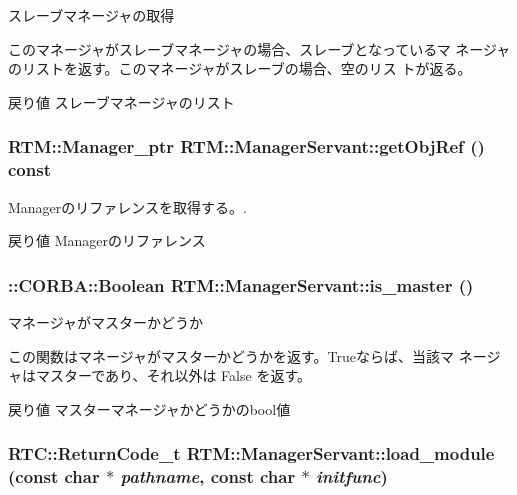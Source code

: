 スレーブマネージャの取得 

このマネージャがスレーブマネージャの場合、スレーブとなっているマ ネージャのリストを返す。このマネージャがスレーブの場合、空のリス トが返る。

\begin{DoxyReturn}{戻り値}
スレーブマネージャのリスト 
\end{DoxyReturn}
\subsubsection[{getObjRef}]{\setlength{\rightskip}{0pt plus 5cm}RTM::Manager\_\-ptr RTM::ManagerServant::getObjRef () const}\label{classRTM_1_1ManagerServant_a592b15c210062c1d64c3c696652e6613}


Managerのリファレンスを取得する。. 

\begin{DoxyReturn}{戻り値}
Managerのリファレンス 
\end{DoxyReturn}
\subsubsection[{is\_\-master}]{\setlength{\rightskip}{0pt plus 5cm}::CORBA::Boolean RTM::ManagerServant::is\_\-master ()}\label{classRTM_1_1ManagerServant_af3962cce6ec2cfbb7dbd7e4e985ac5f3}


マネージャがマスターかどうか 

この関数はマネージャがマスターかどうかを返す。Trueならば、当該マ ネージャはマスターであり、それ以外は False を返す。

\begin{DoxyReturn}{戻り値}
マスターマネージャかどうかのbool値 
\end{DoxyReturn}
\subsubsection[{load\_\-module}]{\setlength{\rightskip}{0pt plus 5cm}RTC::ReturnCode\_\-t RTM::ManagerServant::load\_\-module (const char $\ast$ {\em pathname}, \/  const char $\ast$ {\em initfunc})}\label{classRTM_1_1ManagerServant_ac1d69225890ad440d2d75f665bd31ac6}



